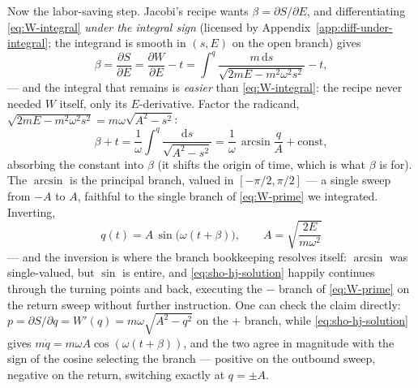 \documentclass[11pt]{article}
\theoremstyle{plain}
\theoremstyle{definition}
\theoremstyle{remark}
\newcommand{\dd}{\mathrm{d}}
\newcommand{\pd}[2]{\frac{\partial #1}{\partial #2}}
\begin{document}
Now the labor-saving step. Jacobi's recipe wants
$\beta = \partial S/\partial E$, and differentiating
\eqref{eq:W-integral} \emph{under the integral sign} (licensed by
Appendix~\ref{app:diff-under-integral}; the integrand is smooth in
$(s, E)$ on the open branch) gives
\begin{equation}
  \beta = \pd{S}{E}
  = \pd{W}{E} - t
  = \int^{q}\frac{m\,\dd s}{\sqrt{2mE - m^2\omega^2 s^2}} - t ,
\end{equation}
--- and the integral that remains is \emph{easier} than
\eqref{eq:W-integral}: the recipe never needed $W$ itself, only its
$E$-derivative. Factor the radicand,
$\sqrt{2mE - m^2\omega^2 s^2} = m\omega\sqrt{A^2 - s^2}$:
\begin{equation}
  \beta + t
  = \frac{1}{\omega}\int^{q}\frac{\dd s}{\sqrt{A^2 - s^2}}
  = \frac{1}{\omega}\,\arcsin\frac{q}{A} + \text{const},
\end{equation}
absorbing the constant into $\beta$ (it shifts the origin of time,
which is what $\beta$ is for). The $\arcsin$ is the principal branch,
valued in $[-\pi/2, \pi/2]$ --- a single sweep from $-A$ to $A$,
faithful to the single branch of \eqref{eq:W-prime} we integrated.
Inverting,
\begin{equation}
  \boxed{\;
  q(t) = A\,\sin\bigl(\omega(t + \beta)\bigr),
  \qquad
  A = \sqrt{\frac{2E}{m\omega^2}}
  \;}
  \label{eq:sho-hj-solution}
\end{equation}
--- and the inversion is where the branch bookkeeping resolves itself:
$\arcsin$ was single-valued, but $\sin$ is entire, and
\eqref{eq:sho-hj-solution} happily continues through the turning
points and back, executing the $-$ branch of \eqref{eq:W-prime} on the
return sweep without further instruction. One can check the claim
directly: $p = \partial S/\partial q = W'(q) = m\omega\sqrt{A^2 - q^2}$
on the $+$ branch, while \eqref{eq:sho-hj-solution} gives
$m\dot q = m\omega A\cos(\omega(t + \beta))$, and the two agree in
magnitude with the sign of the cosine selecting the branch --- positive
on the outbound sweep, negative on the return, switching exactly at
$q = \pm A$.
\end{document}
